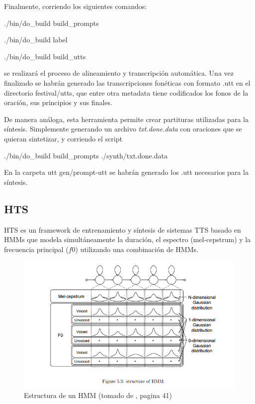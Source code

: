 Finalmente, corriendo los siguientes comandos:

\begin{tcolorbox}
./bin/do\_build build\_prompts

./bin/do\_build label

./bin/do\_build build\_utts
\end{tcolorbox}

\noindent se realizará el proceso de alineamiento y transcripción automática. Una vez finalizado se habrán generado las transcripciones fonéticas con formato .utt en el directorio festival/utts, que entre otra metadata tiene codificados los fonos de la oración, sus principios y sus finales.

De manera análoga, esta herramienta permite crear partituras utilizadas para la síntesis. Simplemente generando un archivo \textit{txt.done.data} con oraciones que se quieran sintetizar, y corriendo el script

\begin{tcolorbox}
./bin/do\_build build\_prompts ./synth/txt.done.data
\end{tcolorbox}

En la carpeta utt gen/prompt-utt se habrán generado los .utt necesarios para la síntesis.


\subsection{HTS}


HTS \cite{hts} es un framework de entrenamiento y síntesis de sistemas TTS basado en HMMs que modela simultáneamente la duración, el espectro (mel-cepstrum) y la frecuencia principal ($f0$) utilizando una combinación de HMMs.

\begin{figure}
\includegraphics[scale=0.5]{imagenes/hmm.png}
\caption{Estructura de un HMM (tomado de \cite{phoneticAndProsodic}, pagina 41)}
\label{hmmStructure}
\centering
\end{figure}

